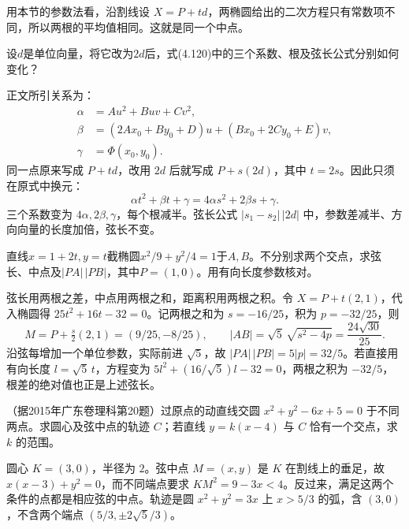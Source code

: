 用本节的参数法看，沿割线设 \(X=P+td\)，两椭圆给出的二次方程只有常数项不同，所以两根的平均值相同。这就是同一个中点。




设\(d\)是单位向量，将它改为\(2d\)后，式\textup{(4.120)}中的三个系数、根及弦长公式分别如何变化？
\par

\par\smallskip\noindent 正文所引关系为：
\begin{equation*}
\begin{aligned}
    \alpha&=Au^2+Buv+Cv^2,\\
    \beta&=(2Ax_0+By_0+D)u+(Bx_0+2Cy_0+E)v,\\
    \gamma&=\Phi(x_0,y_0).
    \end{aligned}
\end{equation*}
\solutionanswer
同一点原来写成 \(P+td\)，改用 \(2d\) 后就写成 \(P+s(2d)\)，其中 \(t=2s\)。因此只须在原式中换元：
\[
    \alpha t^2+\beta t+\gamma=4\alpha s^2+2\beta s+\gamma .
\]
三个系数变为 \(4\alpha,2\beta,\gamma\)，每个根减半。弦长公式 \(|s_1-s_2|\,|2d|\) 中，参数差减半、方向向量的长度加倍，弦长不变。




直线\(x=1+2t,y=t\)截椭圆\(x^2/9+y^2/4=1\)于\(A,B\)。不分别求两个交点，求弦长、中点及\(|PA|\,|PB|\)，其中\(P=(1,0)\)。用有向长度参数核对。
\par
\solutionanswer
弦长用两根之差，中点用两根之和，距离积用两根之积。令 \(X=P+t(2,1)\)，代入椭圆得 \(25t^2+16t-32=0\)。记两根之和为 \(s=-16/25\)，积为 \(p=-32/25\)，则
\[
 M=P+\tfrac{s}{2}(2,1)=(9/25,-8/25),\qquad
 |AB|=\sqrt5\,\sqrt{s^2-4p}=\frac{24\sqrt{30}}{25}.
\]
沿弦每增加一个单位参数，实际前进 \(\sqrt5\)，故 \(|PA|\,|PB|=5|p|=32/5\)。若直接用有向长度 \(l=\sqrt5\,t\)，方程变为 \(5l^2+(16/\sqrt5)l-32=0\)，两根之积为 \(-32/5\)，根差的绝对值也正是上述弦长。


（据2015年广东卷理科第20题）过原点的动直线交圆 \(x^2+y^2-6x+5=0\) 于不同两点。求圆心及弦中点的轨迹 \(C\)；若直线 \(y=k(x-4)\) 与 \(C\) 恰有一个交点，求 \(k\) 的范围。
\par
\solutionanswer
圆心 \(K=(3,0)\)，半径为 \(2\)。弦中点 \(M=(x,y)\) 是 \(K\) 在割线上的垂足，故 \(x(x-3)+y^2=0\)，而不同端点要求 \(KM^2=9-3x<4\)。反过来，满足这两个条件的点都是相应弦的中点。轨迹是圆 \(x^2+y^2=3x\) 上 \(x>5/3\) 的弧，含 \((3,0)\)，不含两个端点 \((5/3,\pm2\sqrt5/3)\)。

